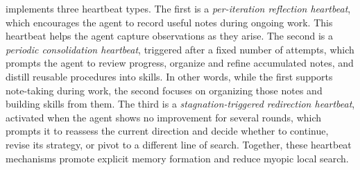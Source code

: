 \method{} implements three heartbeat types. The first is a \emph{per-iteration reflection heartbeat}, which encourages the agent to record useful notes during ongoing work. This heartbeat helps the agent capture observations as they arise. The second is a \emph{periodic consolidation heartbeat}, triggered after a fixed number of attempts, which prompts the agent to review progress, organize and refine accumulated notes, and distill reusable procedures into skills. In other words, while the first supports note-taking during work, the second focuses on organizing those notes and building skills from them. The third is a \emph{stagnation-triggered redirection heartbeat}, activated when the agent shows no improvement for several rounds, which prompts it to reassess the current direction and decide whether to continue, revise its strategy, or pivot to a different line of search. Together, these heartbeat mechanisms promote explicit memory formation and reduce myopic local search.



